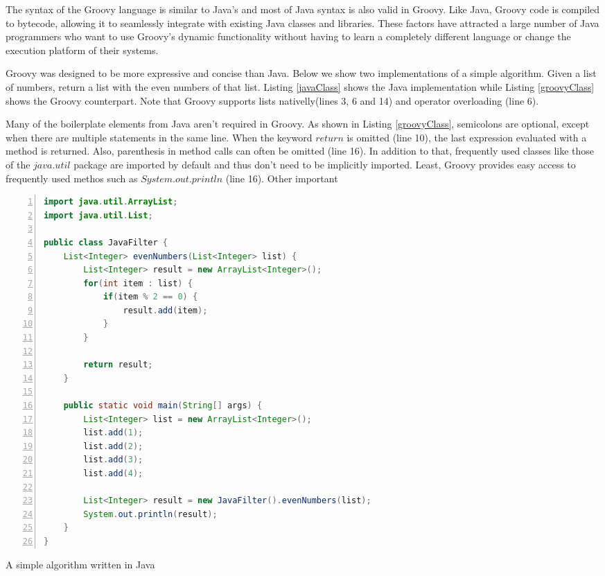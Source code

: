 \documentclass[preprint]{sigplanconf}
\begin{document}
The syntax of the Groovy language is similar to Java's and most of Java syntax is also valid in Groovy.
Like Java, Groovy code is compiled to bytecode, allowing it to seamlessly integrate with existing Java classes and libraries. 
These factors have attracted a large number of Java programmers who want to use Groovy's dynamic functionality without having to learn a completely different language or change the execution platform of their systems. 

Groovy was designed to be more expressive and concise than Java.
Below we show two implementations of a simple algorithm.
Given a list of numbers, return a list with the even numbers of that list.
Listing \ref{javaClass} shows the Java implementation while Listing \ref{groovyClass} shows the Groovy counterpart. 
Note that Groovy supports lists nativelly(lines 3, 6 and 14) and operator overloading (line 6).


Many of the boilerplate elements from Java aren't required in Groovy.  
As shown in Listing \ref{groovyClass}, semicolons are optional, except when there are multiple statements in the same line. 
When the keyword $return$ is omitted (line 10), the last expression evaluated with a method is returned. 
Also, parenthesis in method calls can often be omitted (line 16).
In addition to that, frequently used classes like those of the $java.util$ package are imported by default and thus don't need to be implicitly imported.
Least, Groovy provides easy access to frequently used methos such as $System.out.println$ (line 16). Other important 


\begin{Listing}[ht]
\begin{lstlisting}[language=Java,tabsize=2,breaklines=true,numbers=left]
import java.util.ArrayList;
import java.util.List;

public class JavaFilter {
	List<Integer> evenNumbers(List<Integer> list) {
		List<Integer> result = new ArrayList<Integer>();
		for(int item : list) {
			if(item % 2 == 0) {
				result.add(item);
			}
		}

		return result;
	}

	public static void main(String[] args) {
		List<Integer> list = new ArrayList<Integer>();
		list.add(1);
		list.add(2);
		list.add(3);
		list.add(4);

		List<Integer> result = new JavaFilter().evenNumbers(list);
		System.out.println(result);
	}
}
\end{lstlisting}
\caption{A simple algorithm written in Java}
\label{javaClass}
\end{Listing}
\end{document}
